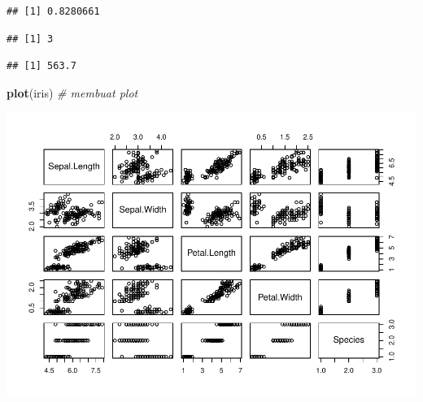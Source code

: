 \documentclass[]{article}
\newenvironment{Shaded}{\begin{snugshade}}{\end{snugshade}}
\newcommand{\CommentTok}[1]{\textcolor[rgb]{0.56,0.35,0.01}{\textit{#1}}}
\newcommand{\KeywordTok}[1]{\textcolor[rgb]{0.13,0.29,0.53}{\textbf{#1}}}
\newcommand{\NormalTok}[1]{#1}
\newcommand{\OperatorTok}[1]{\textcolor[rgb]{0.81,0.36,0.00}{\textbf{#1}}}
\begin{document}
\begin{Shaded}
\end{Shaded}

\begin{verbatim}
## [1] 0.8280661
\end{verbatim}

\begin{Shaded}
\end{Shaded}

\begin{verbatim}
## [1] 3
\end{verbatim}

\begin{Shaded}
\end{Shaded}

\begin{verbatim}
## [1] 563.7
\end{verbatim}

\begin{Shaded}
\begin{Highlighting}[]
\KeywordTok{plot}\NormalTok{(iris) }\CommentTok{# membuat plot}
\end{Highlighting}
\end{Shaded}

\includegraphics{001_pendahuluan_files/figure-latex/unnamed-chunk-5-1.pdf}
\end{document}
